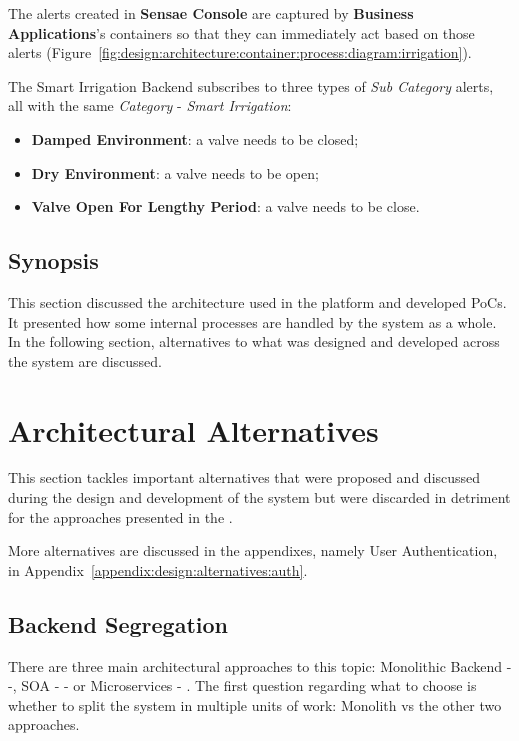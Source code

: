 The alerts created in \textbf{Sensae Console} are captured by \textbf{Business Applications}'s containers so that they can immediately act based on those alerts (Figure~\ref{fig:design:architecture:container:process:diagram:irrigation}).

The Smart Irrigation Backend subscribes to three types of \textit{Sub Category} alerts, all with the same \textit{Category} - \textit{Smart Irrigation}:

\begin{itemize}
   \item \textbf{Damped Environment}: a valve needs to be closed;
   \item \textbf{Dry Environment}: a valve needs to be open;
   \item \textbf{Valve Open For Lengthy Period}: a valve needs to be close.
\end{itemize}

\subsection{Synopsis}
\label{subsubsec:design:architecture:synopsis}

This section discussed the architecture used in the platform and developed \gls{PoC}s. It presented how some internal processes are handled by the system as a whole.
In the following section, alternatives to what was designed and developed across the system are discussed.

\section{Architectural Alternatives}
\label{sec:design:alternatives}

This section tackles important alternatives that were proposed and discussed during the design and development of the system but were discarded in detriment for the approaches presented in the .

More alternatives are discussed in the appendixes, namely User Authentication, in Appendix~\ref{appendix:design:alternatives:auth}.

\subsection{Backend Segregation}
\label{subsec:design:alternatives:backend}

There are three main architectural approaches to this topic: Monolithic Backend - \cite{micromono} -, \gls{SOA} - \cite{ibmsoa} - or Microservices - \cite{martinmicro}. The first question regarding what to choose is whether to split the system in multiple units of work: Monolith vs the other two approaches.

